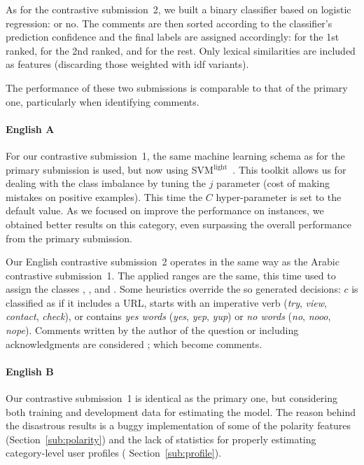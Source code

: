 As for the contrastive submission~2, we built a binary classifier based on 
logistic regression: \dir or no. The comments are then sorted according to the 
classifier's prediction confidence and the final labels are assigned 
accordingly: \dir for the 1st ranked, \rel for the 2nd ranked, and \irel for the 
rest. Only lexical similarities are included as features (discarding those 
weighted with idf variants).


The performance of these two submissions is comparable to that of the primary 
one, particularly when identifying \rel comments. 

\paragraph{English A}

For our contrastive submission~1, the same machine learning schema as for the 
primary submission is used, but now using 
SVM$^\mathrm{light}$~\cite{Joachims:99}. This toolkit allows us for dealing with 
the class imbalance by tuning the $j$ parameter (cost of making mistakes on 
positive examples). This time the $C$ hyper-parameter is set to the default 
value. As we focused on improve the performance on \pot instances, we obtained 
better results on this category, even surpassing the overall performance from 
the primary submission.

Our English contrastive submission~2 operates in the same way as the Arabic 
contrastive submission~1. The applied ranges are the same, this time used to 
assign the classes \good, \pot, and \bad. Some heuristics override the so 
generated decisions: $c$ is classified as \good if it includes a URL, starts 
with an imperative verb (\eg \textit{try}, \textit{view}, \textit{contact}, 
\textit{check}), or contains \textit{yes words} (\eg \textit{yes}, \textit{yep}, 
\textit{yup}) or \textit{no words} (\eg \textit{no}, \textit{nooo}, 
\textit{nope}). Comments written by the author of the question or including 
acknowledgments are considered \dial; which become \bad comments. 



\paragraph{English B}

Our contrastive submission~1 is identical as the primary one, but considering 
both training and development data for estimating the model. The 
reason behind the disastrous results is a buggy implementation of some of 
the polarity features (\cf Section~\ref{sub:polarity}) and the lack of 
statistics for properly estimating category-level user profiles (\cf 
Section~\ref{sub:profile}). 
 
